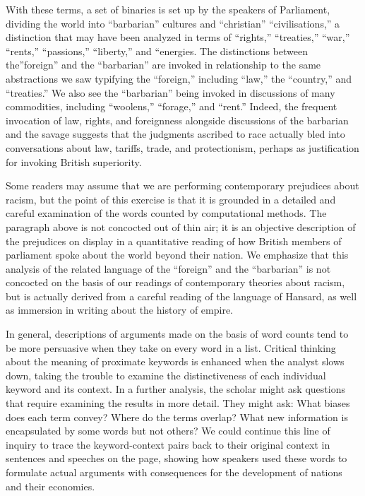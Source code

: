 \documentclass[
]{article}
\begin{document}
With these terms, a set of binaries is set up by the speakers of
Parliament, dividing the world into ``barbarian'' cultures and
``christian'' ``civilisations,'' a distinction that may have been
analyzed in terms of ``rights,'' ``treaties,'' ``war,'' ``rents,''
``passions,'' ``liberty,'' and ``energies. The distinctions between
the''foreign'' and the ``barbarian'' are invoked in relationship to the
same abstractions we saw typifying the ``foreign,'' including ``law,''
the ``country,'' and ``treaties.'' We also see the ``barbarian'' being
invoked in discussions of many commodities, including ``woolens,''
``forage,'' and ``rent.'' Indeed, the frequent invocation of law,
rights, and foreignness alongside discussions of the barbarian and the
savage suggests that the judgments ascribed to race actually bled into
conversations about law, tariffs, trade, and protectionism, perhaps as
justification for invoking British superiority.

Some readers may assume that we are performing contemporary prejudices
about racism, but the point of this exercise is that it is grounded in a
detailed and careful examination of the words counted by computational
methods. The paragraph above is not concocted out of thin air; it is an
objective description of the prejudices on display in a quantitative
reading of how British members of parliament spoke about the world
beyond their nation. We emphasize that this analysis of the related
language of the ``foreign'' and the ``barbarian'' is not concocted on
the basis of our readings of contemporary theories about racism, but is
actually derived from a careful reading of the language of Hansard, as
well as immersion in writing about the history of empire.

In general, descriptions of arguments made on the basis of word counts
tend to be more persuasive when they take on every word in a list.
Critical thinking about the meaning of proximate keywords is enhanced
when the analyst slows down, taking the trouble to examine the
distinctiveness of each individual keyword and its context. In a further
analysis, the scholar might ask questions that require examining the
results in more detail. They might ask: What biases does each term
convey? Where do the terms overlap? What new information is encapsulated
by some words but not others? We could continue this line of inquiry to
trace the keyword-context pairs back to their original context in
sentences and speeches on the page, showing how speakers used these
words to formulate actual arguments with consequences for the
development of nations and their economies.
\end{document}
